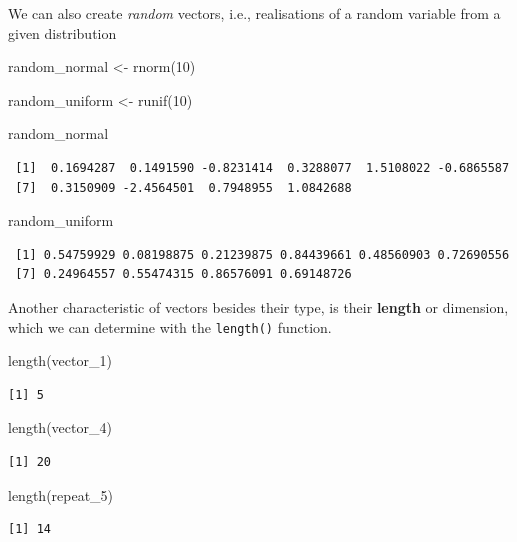 \documentclass[
  letterpaper,
  DIV=11,
  numbers=noendperiod]{scrartcl}
\newenvironment{Shaded}{\begin{snugshade}}{\end{snugshade}}
\newcommand{\DecValTok}[1]{\textcolor[rgb]{0.68,0.00,0.00}{#1}}
\newcommand{\FunctionTok}[1]{\textcolor[rgb]{0.28,0.35,0.67}{#1}}
\newcommand{\NormalTok}[1]{\textcolor[rgb]{0.00,0.23,0.31}{#1}}
\newcommand{\OtherTok}[1]{\textcolor[rgb]{0.00,0.23,0.31}{#1}}
\begin{document}
\begin{tcolorbox}
We can also create \emph{random} vectors, i.e., realisations of a random
variable from a given distribution

\begin{Shaded}
\begin{Highlighting}[]
\NormalTok{random\_normal }\OtherTok{\textless{}{-}} \FunctionTok{rnorm}\NormalTok{(}\DecValTok{10}\NormalTok{)}

\NormalTok{random\_uniform }\OtherTok{\textless{}{-}} \FunctionTok{runif}\NormalTok{(}\DecValTok{10}\NormalTok{)}

\NormalTok{random\_normal}
\end{Highlighting}
\end{Shaded}

\begin{verbatim}
 [1]  0.1694287  0.1491590 -0.8231414  0.3288077  1.5108022 -0.6865587
 [7]  0.3150909 -2.4564501  0.7948955  1.0842688
\end{verbatim}

\begin{Shaded}
\begin{Highlighting}[]
\NormalTok{random\_uniform}
\end{Highlighting}
\end{Shaded}

\begin{verbatim}
 [1] 0.54759929 0.08198875 0.21239875 0.84439661 0.48560903 0.72690556
 [7] 0.24964557 0.55474315 0.86576091 0.69148726
\end{verbatim}

\end{tcolorbox}

Another characteristic of vectors besides their type, is their
\textbf{length} or dimension, which we can determine with the
\texttt{length()} function.

\begin{Shaded}
\begin{Highlighting}[]
\FunctionTok{length}\NormalTok{(vector\_1)}
\end{Highlighting}
\end{Shaded}

\begin{verbatim}
[1] 5
\end{verbatim}

\begin{Shaded}
\begin{Highlighting}[]
\FunctionTok{length}\NormalTok{(vector\_4)}
\end{Highlighting}
\end{Shaded}

\begin{verbatim}
[1] 20
\end{verbatim}

\begin{Shaded}
\begin{Highlighting}[]
\FunctionTok{length}\NormalTok{(repeat\_5)}
\end{Highlighting}
\end{Shaded}

\begin{verbatim}
[1] 14
\end{verbatim}
\end{document}
